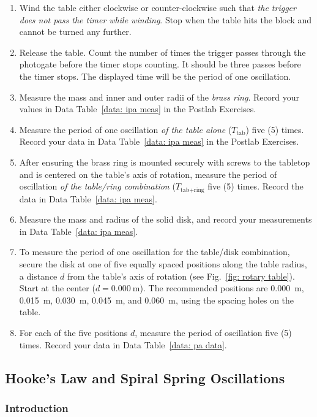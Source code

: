 \documentclass[addpoints]{physlabs}
\begin{document}
\begin{labsection}
\begin{experiment}
\begin{enumerate}
    \item Wind the table either clockwise or counter-clockwise such that {\sl the trigger does not pass the timer while winding}. Stop when the table hits the block and cannot be turned any further.
    \item Release the table. Count the number of times the trigger passes through the photogate before the timer stops counting. It should be three passes before the timer stops. The displayed time will be the period of one oscillation.
    \item Measure the mass and inner and outer radii of the {\sl brass ring}. Record your values in Data Table~\ref{data: ipa meas} in the Postlab Exercises.
    \item Measure the period of one oscillation {\sl of the table alone} ($T_\text{tab}$) five (5) times. Record your data in Data Table~\ref{data: ipa meas} in the Postlab Exercises.
    \item After ensuring the brass ring is mounted securely with screws to the tabletop and is centered on the table's axis of rotation, measure the period of oscillation {\sl of the table/ring combination} ($T_{\text{tab}+\text{ring}}$ five (5) times. Record the data in Data Table~\ref{data: ipa meas}.
    \item Measure the mass and radius of the solid disk, and record your measurements in Data Table~\ref{data: ipa meas}.
    \item To measure the period of one oscillation for the table/disk combination, secure the disk at one of five equally spaced positions along the table radius, a distance $d$ from the table's axis of rotation (see Fig.~\ref{fig: rotary table}). Start at the center ($d=\qty{0.000}{\meter}$). The recommended positions are \qty{0.000}{\meter}, \qty{0.015}{\meter}, \qty{0.030}{\meter}, \qty{0.045}{\meter}, and \qty{0.060}{\meter}, using the spacing holes on the table.
    \item For each of the five positions $d$, measure the period of oscillation five (5) times. Record your data in Data Table~\ref{data: pa data}.
\end{enumerate}

\subsection*{Hooke's Law and Spiral Spring Oscillations}

\subsubsection*{Introduction}


\end{experiment}
\end{labsection}
\end{document}
